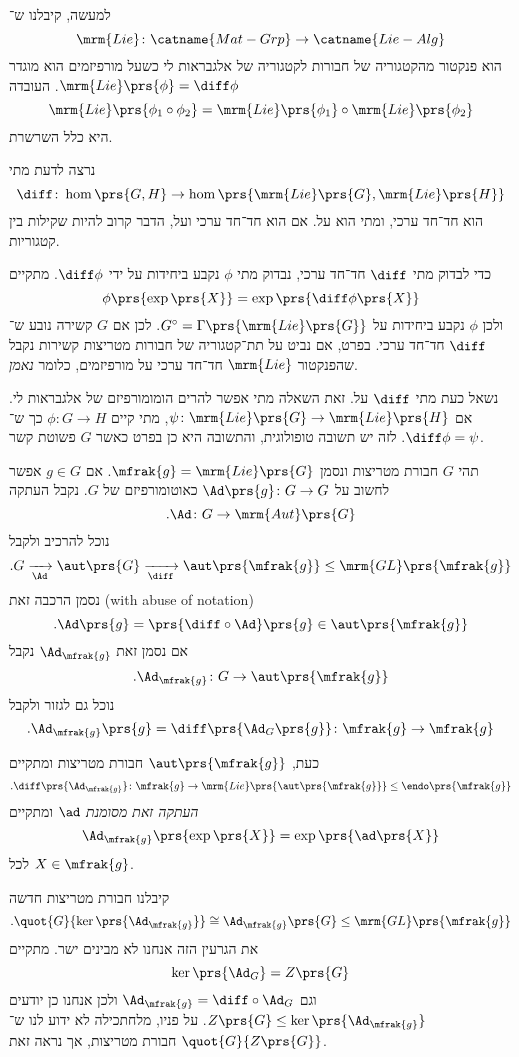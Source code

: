 \documentclass[10pt, twoside]{book}
\newcommand{\textenglish}[1]{\foreignlanguage{english}{#1}}
\newcommand{\Lie}{\mrm{Lie}}
\begin{document}
\begin{remark}
למעשה, קיבלנו ש־%
\[\mrm{Lie} \colon \catname{Mat-Grp} \to \catname{Lie-Alg}\]
הוא פנקטור מהקטגוריה של חבורות לקטגוריה של אלגבראות לי
כשעל מורפיזמים הוא מוגדר
$\mrm{Lie}\prs{\phi} = \diff \phi$.
העובדה
\[\mrm{Lie}\prs{\phi_1 \circ \phi_2} = \mrm{Lie}\prs{\phi_1} \circ \mrm{Lie}\prs{\phi_2}\]
היא כלל השרשרת.
\end{remark}

נרצה לדעת מתי
\[\diff \colon \hom\prs{G,H} \to \hom\prs{\Lie\prs{G}, \Lie\prs{H}}\]
הוא חד־חד ערכי, ומתי הוא על. אם הוא חד־חד ערכי ועל, הדבר קרוב להיות שקילות בין קטגוריות.

כדי לבדוק מתי
$\diff$
חד־חד ערכי, נבדוק מתי
$\phi$
נקבע ביחידות על ידי
$\diff \phi$.
מתקיים
\[\phi\prs{\exp\prs{X}} = \exp\prs{\diff \phi\prs{X}}\]
ולכן
$\phi$
נקבע ביחידות על
$G^\circ = \Gamma\prs{\Lie\prs{G}}$.
לכן אם
$G$
קשירה נובע ש־%
$\diff$
חד־חד ערכי.
בפרט, אם נביט על תת־קטגוריה של חבורות מטריצות קשירות נקבל שהפנקטור
$\Lie$
חד־חד ערכי על מורפיזמים, כלומר
\emph{נאמן}.

נשאל כעת מתי
$\diff$
על. זאת השאלה מתי אפשר להרים הומומורפיזם של אלגבראות לי. אם
$\psi \colon \Lie\prs{G} \to \Lie\prs{H}$,
מתי קיים
$\phi \colon G \to H$
כך ש־%
$\diff \phi = \psi$.
לזה יש תשובה טופולוגית, והתשובה היא כן בפרט כאשר
$G$
פשוטת קשר.

\begin{remark}
תהי
$G$
חבורת מטריצות ונסמן
$\mfrak{g} = \Lie\prs{G}$.
אם
$g \in G$
אפשר לחשוב על
$\Ad\prs{g} \colon G \to G$
כאוטומורפיזם של
$G$.
נקבל העתקה
\[ \text{.} \Ad \colon G \to \mrm{Aut}\prs{G}\]
נוכל להרכיב ולקבל
\[\text{.} G \xrightarrow[\Ad]{} \aut\prs{G} \xrightarrow[\diff]{} \aut\prs{\mfrak{g}} \leq \mrm{GL}\prs{\mfrak{g}}\]
נסמן הרכבה זאת (\textenglish{with abuse of notation})
\[\text{.} \Ad\prs{g} = \prs{\diff \circ \Ad}\prs{g} \in \aut\prs{\mfrak{g}}\]
אם נסמן זאת
$\Ad_{\mfrak{g}}$
נקבל
\[\text{.} \Ad_{\mfrak{g}} \colon G \to \aut\prs{\mfrak{g}}\]
נוכל גם לגזור ולקבל
\[\text{.}\Ad_{\mfrak{g}}\prs{g} = \diff\prs{\Ad_G\prs{g}} \colon \mfrak{g} \to \mfrak{g}\]

כעת,
$\aut\prs{\mfrak{g}}$
חבורת מטריצות ומתקיים
\[\text{.}\diff \prs{\Ad_{\mfrak{g}}} \colon \mfrak{g} \to \Lie\prs{\aut\prs{\mfrak{g}}} \leq \endo\prs{\mfrak{g}}\]
\emph{%
העתקה זאת מסומנת
$\ad$}
ומתקיים
\[\Ad_{\mfrak{g}}\prs{\exp\prs{X}} = \exp\prs{\ad\prs{X}}\]
לכל
$X \in \mfrak{g}$.
\end{remark}

קיבלנו חבורת מטריצות חדשה
\[\text{.} \quot{G}{\ker\prs{\Ad_{\mfrak{g}}}} \cong \Ad_{\mfrak{g}}\prs{G} \leq \mrm{GL}\prs{\mfrak{g}}\]
את הגרעין הזה אנחנו לא מבינים ישר. מתקיים
\[\ker\prs{\Ad_G} = Z\prs{G}\]
וגם
$\Ad_{\mfrak{g}} = \diff \circ \Ad_G$
ולכן אנחנו כן יודעים
$Z\prs{G} \leq \ker\prs{\Ad_{\mfrak{g}}}$.
על פניו, מלחתכילה לא ידוע לנו ש־%
$\quot{G}{Z\prs{G}}$
חבורת מטריצות, אך נראה זאת.
\end{document}
